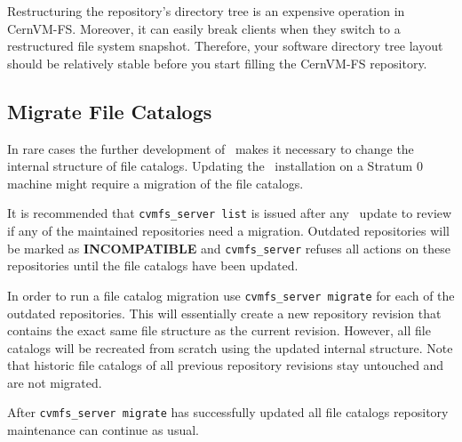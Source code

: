 Restructuring the repository's directory tree is an expensive operation in CernVM-FS. 
Moreover, it can easily break clients when they switch to a restructured file system snapshot. 
Therefore, your software directory tree layout should be relatively stable before you start filling the CernVM-FS repository.

\subsection{Migrate File Catalogs}
In rare cases the further development of \cvmfs\ makes it necessary to change the internal structure of file catalogs.
Updating the \cvmfs\ installation on a Stratum 0 machine might require a migration of the file catalogs.

It is recommended that \texttt{cvmfs\_server list} is issued after any \cvmfs\ update to review if any of the maintained repositories need a migration.
Outdated repositories will be marked as \textbf{INCOMPATIBLE} and \texttt{cvmfs\_server} refuses all actions on these repositories until the file catalogs have been updated.

In order to run a file catalog migration use \texttt{cvmfs\_server migrate} for each of the outdated repositories.
This will essentially create a new repository revision that contains the exact same  file structure as the current revision.
However, all file catalogs will be recreated from scratch using the updated internal structure.
Note that historic file catalogs of all previous repository revisions stay untouched and are not migrated.

After \texttt{cvmfs\_server migrate} has successfully updated all file catalogs repository maintenance can continue as usual.

